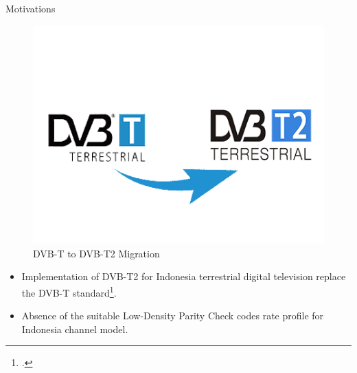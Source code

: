 \documentclass{beamer}
\begin{document}
\begin{frame}{Motivations}
\begin{center}
\begin{figure}\vspace{-2cm}\hspace{10cm}
\includegraphics[scale=0.3]{pict/migrasi.png}
\caption*{\tiny DVB-T to DVB-T2 Migration}
\end{figure}
\end{center}

\begin{itemize}\vspace{0cm}
\item {\small Implementation of DVB-T2 for Indonesia terrestrial digital television replace the DVB-T standard\footcite{regul}.}
\item {\small Absence of the suitable Low-Density Parity Check codes rate profile for Indonesia channel model.}

\end{itemize}

\end{frame}
\end{document}
